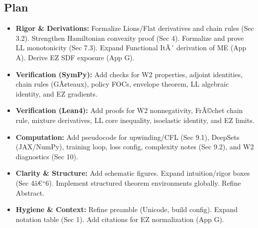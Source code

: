 \documentclass[11pt,letterpaper,oneside]{article}
\numberwithin{equation}{section}
\newcommand{\1}{\mathbf{1}}
\begin{document}
\subsection*{Plan}
\begin{itemize}[leftmargin=1.2em]
  \item \textbf{Rigor \& Derivations:} Formalize Lions/Flat derivatives and chain rules (Sec 3.2). Strengthen Hamiltonian convexity proof (Sec 4). Formalize and prove LL monotonicity (Sec 7.3). Expand Functional ItÃ´ derivation of ME (App A). Derive EZ SDF exposure (App G).
  \item \textbf{Verification (SymPy):} Add checks for W2 properties, adjoint identities, chain rules (GÃ¢teaux), policy FOCs, envelope theorem, LL algebraic identity, and EZ gradients.
  \item \textbf{Verification (Lean4):} Add proofs for W2 nonnegativity, FrÃ©chet chain rule, mixture derivatives, LL core inequality, isoelastic identity, and EZ limits.
  \item \textbf{Computation:} Add pseudocode for upwinding/CFL (Sec 9.1), DeepSets (JAX/NumPy), training loop, loss config, complexity notes (Sec 9.2), and W2 diagnostics (Sec 10).
  \item \textbf{Clarity \& Structure:} Add schematic figures. Expand intuition/rigor boxes (Sec 4â€“6). Implement structured theorem environments globally. Refine Abstract.
  \item \textbf{Hygiene \& Context:} Refine preamble (Unicode, build config). Expand notation table (Sec 1). Add citations for EZ normalization (App G).
\end{itemize}
\end{document}
